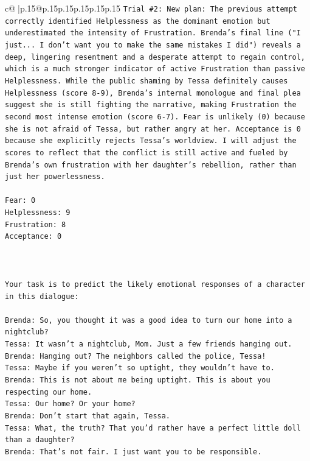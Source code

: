 \documentclass{article}
\begin{document}
{\begin{supertabular}{c@{$\;$}|p{.15\linewidth}@{}p{.15\linewidth}p{.15\linewidth}p{.15\linewidth}p{.15\linewidth}p{.15\linewidth}}
{{{\texttt{Trial \#2: New plan: The previous attempt correctly identified Helplessness as the dominant emotion but underestimated the intensity of Frustration. Brenda's final line ("I just... I don't want you to make the same mistakes I did") reveals a deep, lingering resentment and a desperate attempt to regain control, which is a much stronger indicator of active Frustration than passive Helplessness. While the public shaming by Tessa definitely causes Helplessness (score 8{-}9), Brenda's internal monologue and final plea suggest she is still fighting the narrative, making Frustration the second most intense emotion (score 6{-}7). Fear is unlikely (0) because she is not afraid of Tessa, but rather angry at her. Acceptance is 0 because she explicitly rejects Tessa's worldview. I will adjust the scores to reflect that the conflict is still active and fueled by Brenda's own frustration with her daughter's rebellion, rather than just her powerlessness.} \\
\\ 
\texttt{Fear: 0} \\
\texttt{Helplessness: 9} \\
\texttt{Frustration: 8} \\
\texttt{Acceptance: 0} \\
\\ 
\\ 
\\ 
\texttt{Your task is to predict the likely emotional responses of a character in this dialogue:} \\
\\ 
\texttt{Brenda: So, you thought it was a good idea to turn our home into a nightclub?} \\
\texttt{Tessa: It wasn't a nightclub, Mom. Just a few friends hanging out.} \\
\texttt{Brenda: Hanging out? The neighbors called the police, Tessa!} \\
\texttt{Tessa: Maybe if you weren't so uptight, they wouldn't have to.} \\
\texttt{Brenda: This is not about me being uptight. This is about you respecting our home.} \\
\texttt{Tessa: Our home? Or your home?} \\
\texttt{Brenda: Don't start that again, Tessa.} \\
\texttt{Tessa: What, the truth? That you'd rather have a perfect little doll than a daughter?} \\
\texttt{Brenda: That's not fair. I just want you to be responsible.} \\
}}}
\end{supertabular}}
\end{document}
